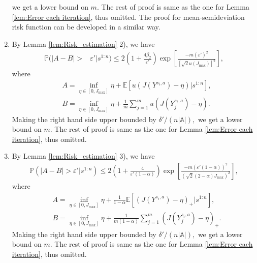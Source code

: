 \documentclass[12pt,technote,onecolumn]{IEEEtran}
\begin{document}
\begin{IEEEproof}
\begin{enumerate}
		we get a lower bound on $m.$ The rest of proof is same as the one
		for Lemma \ref{lem:Error each iteration}, thus omitted. The proof
		for mean-semideviation risk function can be developed in a similar
		way.
		\item By Lemma \ref{lem:Risk_estimation} 2), we have
		\begin{equation*}
		\begin{aligned}
		\mathbb{P}(\left|A-B\right|>&\varepsilon'\big|s^{1:n})
		\leq2\left(1+\frac{4\beta_{2}}{\varepsilon'}\right)\exp\left[\frac{-m\left(\varepsilon'\right)^{2}}{\left[\sqrt{2}u\left(J_{\max}\right)\right]^{2}}\right],
		\end{aligned}
		\end{equation*}
		where 
		\begin{equation*}
		\begin{aligned}
		&   A=\inf_{\eta\in\left[0,J_{\max}\right]}\eta+\mathbb{E}\left[u\left(J\left(Y^{s_{i},a}\right)-\eta\right)|s^{1:n}\right],\\
		&   B=\inf_{\eta\in\left[0,J_{\max}\right]}\eta+\frac{1}{m}\sum_{j=1}^{m}u\left(J\left(Y_{j}^{s_{i},a}\right)-\eta\right).
		\end{aligned}
		\end{equation*}
		Making the right hand side upper bounded by $\delta'/\left(n\left|\mathbb{A}\right|\right),$
		we get a lower bound on $m.$ The rest of proof is same as the one
		for Lemma \ref{lem:Error each iteration}, thus omitted. 
		\item By Lemma \ref{lem:Risk_estimation} 3), we have
		\begin{equation*}
		\begin{aligned}
		\mathbb{P}(\left|A-B\right|>\varepsilon'\big|s^{1:n})
		\leq2\left(1+\frac{4}{\varepsilon'\left(1-\alpha\right)}\right)\exp\left[\frac{-m\left(\varepsilon'\left(1-\alpha\right)\right)^{2}}{\left(\sqrt{2}\left(2-\alpha\right)J_{\max}\right)^{2}}\right],
		\end{aligned}
		\end{equation*}
		where
		\begin{equation*}
		\begin{aligned}
		&   A=\inf_{\eta\in\left[0,J_{\max}\right]}\eta+\frac{1}{1-\alpha}\mathbb{E}\left[\left(J\left(Y^{s_{i},a}\right)-\eta\right)_{+}|s^{1:n}\right],\\
		&   B=\inf_{\eta\in\left[0,J_{\max}\right]}\eta+\frac{1}{m\left(1-\alpha\right)}\sum_{j=1}^{m}\left(J\left(Y_{j}^{s_{i},a}\right)-\eta\right)_{+}.
		\end{aligned}
		\end{equation*}
		Making the right hand side upper bounded by $\delta'/\left(n\left|\mathbb{A}\right|\right),$
		we get a lower bound on $m.$ The rest of proof is same as the one
		for Lemma \ref{lem:Error each iteration}, thus omitted. 
	\end{enumerate}
\end{IEEEproof}
\end{document}
